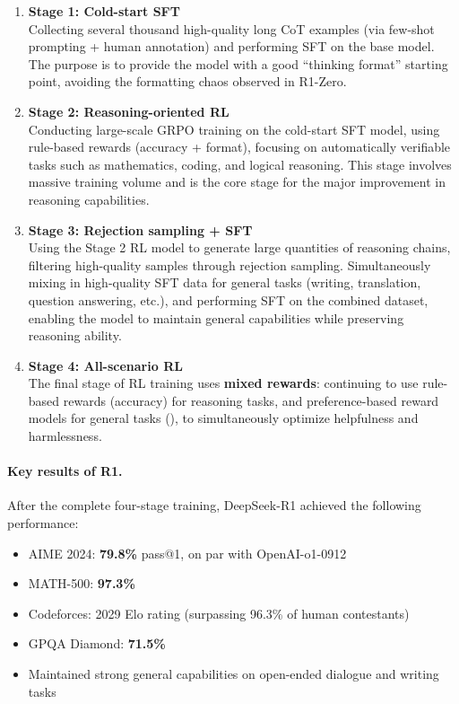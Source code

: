 \begin{enumerate}[leftmargin=2em]
  \item \textbf{Stage 1: Cold-start SFT}\\
    Collecting several thousand high-quality long CoT examples (via few-shot prompting + human annotation)
    and performing SFT on the base model.
    The purpose is to provide the model with a good ``thinking format'' starting point,
    avoiding the formatting chaos observed in R1-Zero.

  \item \textbf{Stage 2: Reasoning-oriented RL}\\
    Conducting large-scale GRPO training on the cold-start SFT model,
    using rule-based rewards (accuracy + format),
    focusing on automatically verifiable tasks such as mathematics, coding, and logical reasoning.
    This stage involves massive training volume and is the core stage for the major improvement in reasoning capabilities.

  \item \textbf{Stage 3: Rejection sampling + SFT}\\
    Using the Stage 2 RL model to generate large quantities of reasoning chains,
    filtering high-quality samples through rejection sampling.
    Simultaneously mixing in high-quality SFT data for general tasks (writing, translation, question answering, etc.),
    and performing SFT on the combined dataset,
    enabling the model to maintain general capabilities while preserving reasoning ability.

  \item \textbf{Stage 4: All-scenario RL}\\
    The final stage of RL training uses \textbf{mixed rewards}:
    continuing to use rule-based rewards (accuracy) for reasoning tasks,
    and preference-based reward models for general tasks
    (),
    to simultaneously optimize helpfulness and harmlessness.
\end{enumerate}

\paragraph{Key results of R1.}
After the complete four-stage training, DeepSeek-R1 achieved the following performance:
\begin{itemize}[leftmargin=2em]
  \item AIME 2024: \textbf{79.8\%} pass@1, on par with OpenAI-o1-0912
  \item MATH-500: \textbf{97.3\%}
  \item Codeforces: 2029 Elo rating (surpassing 96.3\% of human contestants)
  \item GPQA Diamond: \textbf{71.5\%}
  \item Maintained strong general capabilities on open-ended dialogue and writing tasks
\end{itemize}

